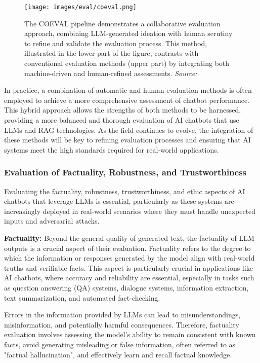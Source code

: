 \begin{figure}[h!]
    \centering
    \texttt{[image: images/eval/coeval.png]}
    \caption{The COEVAL pipeline demonstrates a collaborative evaluation approach, combining LLM-generated ideation with human scrutiny to refine and validate the evaluation process. This method, illustrated in the lower part of the figure, contrasts with conventional evaluation methods (upper part) by integrating both machine-driven and human-refined assessments. \textit{Source:} \cite{li2023collaborative}}
    \label{fig:coeval_pipeline}
\end{figure}

In practice, a combination of automatic and human evaluation methods is often employed to achieve a more comprehensive assessment of chatbot performance. This hybrid approach allows the strengths of both methods to be harnessed, providing a more balanced and thorough evaluation of AI chatbots that use LLMs and RAG technologies. As the field continues to evolve, the integration of these methods will be key to refining evaluation processes and ensuring that AI systems meet the high standards required for real-world applications.

\subsubsection{Evaluation of Factuality, Robustness, and Trustworthiness}

Evaluating the factuality, robustness, trustworthiness, and ethic aspects of AI chatbots that leverage LLMs is essential, particularly as these systems are increasingly deployed in real-world scenarios where they must handle unexpected inputs and adversarial attacks.

\textbf{Factuality:} Beyond the general quality of generated text, the factuality of LLM outputs is a crucial aspect of their evaluation. Factuality refers to the degree to which the information or responses generated by the model align with real-world truths and verifiable facts. This aspect is particularly crucial in applications like AI chatbots, where accuracy and reliability are essential, especially in tasks such as question answering (QA) systems, dialogue systems, information extraction, text summarization, and automated fact-checking.

Errors in the information provided by LLMs can lead to misunderstandings, misinformation, and potentially harmful consequences. Therefore, factuality evaluation involves assessing the model’s ability to remain consistent with known facts, avoid generating misleading or false information, often referred to as "factual hallucination", and effectively learn and recall factual knowledge.

